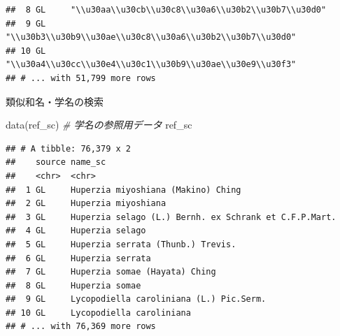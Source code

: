 \documentclass[
  a5paper,
  landscape,
  notitlepage]{report}
\newenvironment{Shaded}{\begin{snugshade}}{\end{snugshade}}
\newcommand{\CommentTok}[1]{\textcolor[rgb]{0.56,0.35,0.01}{\textit{#1}}}
\newcommand{\FunctionTok}[1]{\textcolor[rgb]{0.00,0.00,0.00}{#1}}
\newcommand{\NormalTok}[1]{#1}
\begin{document}
\begin{verbatim}
##  8 GL     "\\u30aa\\u30cb\\u30c8\\u30a6\\u30b2\\u30b7\\u30d0"       
##  9 GL     "\\u30b3\\u30b9\\u30ae\\u30c8\\u30a6\\u30b2\\u30b7\\u30d0"
## 10 GL     "\\u30a4\\u30cc\\u30e4\\u30c1\\u30b9\\u30ae\\u30e9\\u30f3"
## # ... with 51,799 more rows
\end{verbatim}

\newpage

\fontsize{32pt}{32pt}\selectfont

\begin{center}
類似和名・学名の検索
\end{center}

\fontsize{16pt}{16pt}\selectfont

\begin{Shaded}
\begin{Highlighting}[]
\FunctionTok{data}\NormalTok{(ref\_sc)  }\CommentTok{\# 学名の参照用データ}
\NormalTok{ref\_sc}
\end{Highlighting}
\end{Shaded}

\begin{verbatim}
## # A tibble: 76,379 x 2
##    source name_sc                                              
##    <chr>  <chr>                                                
##  1 GL     Huperzia miyoshiana (Makino) Ching                   
##  2 GL     Huperzia miyoshiana                                  
##  3 GL     Huperzia selago (L.) Bernh. ex Schrank et C.F.P.Mart.
##  4 GL     Huperzia selago                                      
##  5 GL     Huperzia serrata (Thunb.) Trevis.                    
##  6 GL     Huperzia serrata                                     
##  7 GL     Huperzia somae (Hayata) Ching                        
##  8 GL     Huperzia somae                                       
##  9 GL     Lycopodiella caroliniana (L.) Pic.Serm.              
## 10 GL     Lycopodiella caroliniana                             
## # ... with 76,369 more rows
\end{verbatim}
\end{document}
